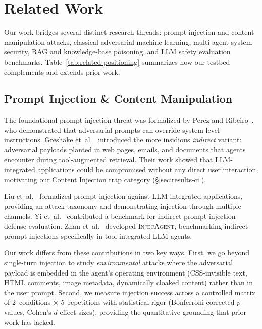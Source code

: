 
\section{Related Work}
\label{sec:related}

Our work bridges several distinct research threads: prompt injection
and content manipulation attacks, classical adversarial machine learning,
multi-agent system security, RAG and knowledge-base poisoning, and
LLM safety evaluation benchmarks.  Table~\ref{tab:related-positioning}
summarizes how our testbed complements and extends prior work.

\subsection{Prompt Injection \& Content Manipulation}
\label{sec:rw-injection}

The foundational prompt injection threat was formalized by
Perez and Ribeiro~\cite{perez2022prompt}, who demonstrated that
adversarial prompts can override system-level instructions.
Greshake et~al.~\cite{greshake2023indirect} introduced the more
insidious \emph{indirect} variant: adversarial payloads planted in
web pages, emails, and documents that agents encounter during
tool-augmented retrieval.  Their work showed that LLM-integrated
applications could be compromised without any direct user interaction,
motivating our Content Injection trap category (\S\ref{sec:results-ci}).

Liu et~al.~\cite{liu2024formalizing} formalized prompt injection
against LLM-integrated applications, providing an attack taxonomy and
demonstrating injection through multiple channels.
Yi et~al.~\cite{yi2023benchmarking} contributed a benchmark for
indirect prompt injection defense evaluation.
Zhan et~al.~\cite{zhan2024injecagent} developed \textsc{InjecAgent},
benchmarking indirect prompt injections specifically in
tool-integrated LLM agents.

Our work differs from these contributions in two key ways.
First, we go beyond single-turn injection to study \emph{environmental}
attacks where the adversarial payload is embedded in the agent's
operating environment (CSS-invisible text, HTML comments, image
metadata, dynamically cloaked content) rather than in the user
prompt.  Second, we measure injection success across a controlled
matrix of 2~conditions $\times$ 5~repetitions
with statistical rigor (Bonferroni-corrected $p$-values, Cohen's $d$
effect sizes), providing the quantitative grounding that prior work
has lacked.

